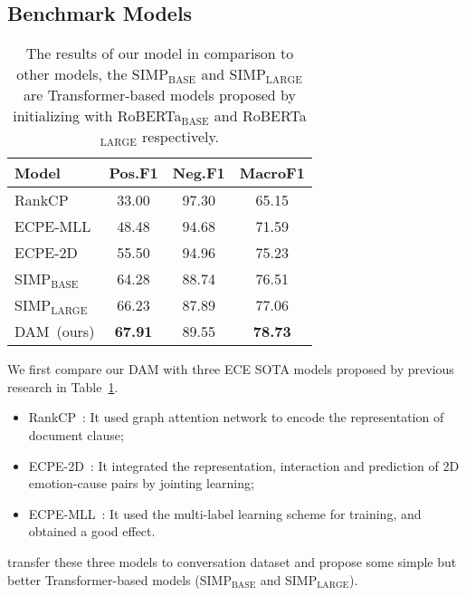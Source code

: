 \documentclass[11pt]{article}
\begin{document}
\subsection{Benchmark Models}
\begin{table}
    \centering
    \begin{tabular}{lccc}
            \toprule
            \textbf{Model}         & \textbf{Pos.F1}    & \textbf{Neg.F1}   & \textbf{MacroF1}  \\
            \midrule
            RankCP        & 33.00     & 97.30    & 65.15     \\
            ECPE-MLL      & 48.48     & 94.68    & 71.59     \\
            ECPE-2D       & 55.50     & 94.96    & 75.23     \\
            SIMP$_{\textrm{BASE}}$  & 64.28     & 88.74    & 76.51    \\
            SIMP$_{\textrm{LARGE}}$ & 66.23     & 87.89    & 77.06    \\
            \midrule
            DAM~(ours)   & {\bfseries 67.91}     & 89.55    & {\bfseries 78.73}     \\
            \bottomrule
    \end{tabular}
     \caption{The results of our model in comparison to other models, the SIMP$_{\textrm{BASE}}$ and SIMP$_{\textrm{LARGE}}$ are Transformer-based models proposed by \citet{poria2021recognizing} initializing with RoBERTa$_{\textrm{BASE}}$ and RoBERTa$_{\textrm{LARGE}}$ respectively.}
    \label{tab1}
\end{table}
We first compare our DAM with three ECE SOTA models proposed by previous research in Table~\ref{tab1}.
\begin{itemize}
\item[1.] RankCP~\cite{wei2020effective}: It used graph attention network to encode the representation of document clause;
\item[2.] ECPE-2D~\cite{ding2020ecpe}: It integrated the representation, interaction and prediction of 2D emotion-cause pairs by jointing learning;
\item[3.] ECPE-MLL~\cite{ding2020end}: It used the multi-label learning scheme for training, and obtained a good effect.
\end{itemize}
\citet{poria2021recognizing} transfer these three models to conversation dataset and propose some simple but better Transformer-based models (SIMP$_{\textrm{BASE}}$ and SIMP$_{\textrm{LARGE}}$). 
\end{document}
